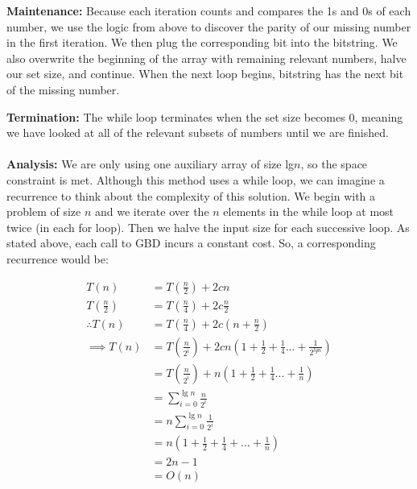 \documentclass[11pt]{article}
\begin{document}
\textbf{Maintenance:} Because each iteration counts and compares the 1s and 0s of each number, we use the logic from above to discover the parity of our missing number in the first iteration. We then plug the corresponding bit into the bitstring. We also overwrite the beginning of the array with remaining relevant numbers, halve our set size, and continue. When the next loop begins, bitstring has the next bit of the missing number. 

\textbf{Termination:} The while loop terminates when the set size becomes 0, meaning we have looked at all of the relevant subsets of numbers until we are finished. \\\\

\noindent \textbf{Analysis:} We are only using one auxiliary array of size lg$n$, so the space constraint is met. Although this method uses a while loop, we can imagine a recurrence to think about the complexity of this solution. We begin with a problem of size $n$ and we iterate over the $n$ elements in the while loop at most twice (in each for loop). Then we halve the input size for each successive loop. As stated above, each call to GBD incurs a constant cost. So, a corresponding recurrence would be: 

\begin{align*}
T(n) &= T(\frac n2) + 2cn\\
T(\frac n2) &= T(\frac n4) + 2c\frac n2\\
\therefore T(n) &= T(\frac n4) + 2c(n + \frac n2)\\
\implies T(n) &= T(\frac n{2^i}) +2cn(1 + \frac 12 + \frac 14...+\frac 1{2^{lg n}})\\&= T(\frac n{2^i}) +n(1 + \frac 12 + \frac 14...+\frac 1n)\\
&= \sum_{\textstyle i=0}^{\textstyle \lg n} \frac n{2^i}\\
&= n\sum_{\textstyle i=0}^{\textstyle \lg n} \frac 1{2^i}\\
&= n(1+ \frac 12 + \frac 14 +...+ \frac 1n)\\
&= 2n-1\\ 
&= O(n)
\end{align*}
\end{document}
